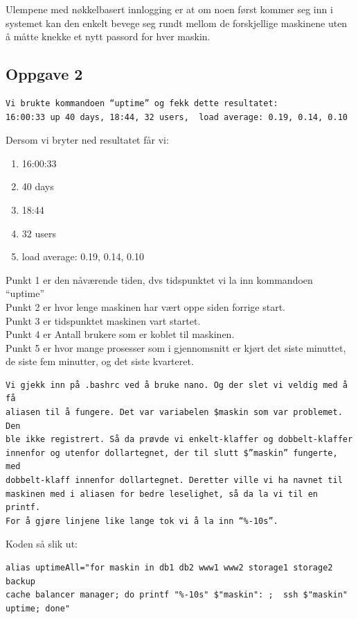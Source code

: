 \documentclass[a4paper, norsk, 12pt]{article}
\begin{document}
Ulempene med nøkkelbasert innlogging er at om noen først kommer seg inn i systemet kan den enkelt bevege seg rundt mellom de forskjellige maskinene uten å måtte knekke et nytt passord for hver maskin.

\subsection*{Oppgave 2}
\begin{verbatim}
Vi brukte kommandoen “uptime” og fekk dette resultatet:
16:00:33 up 40 days, 18:44, 32 users,  load average: 0.19, 0.14, 0.10
\end{verbatim}

Dersom vi bryter ned resultatet får vi:\\
\begin{enumerate}
\item 16:00:33
\item 40 days
\item 18:44
\item 32 users
\item load average: 0.19, 0.14, 0.10
\end{enumerate}

Punkt 1 er den nåværende tiden, dvs tidspunktet vi la inn kommandoen “uptime”\\
Punkt 2 er hvor lenge maskinen har vært oppe siden forrige start.\\
Punkt 3 er tidspunktet maskinen vart startet.\\
Punkt 4 er Antall brukere som er koblet til maskinen.\\
Punkt 5 er hvor mange prosesser som i gjennomsnitt er kjørt det siste minuttet, de siste fem minutter, og det siste kvarteret.

\begin{verbatim}
Vi gjekk inn på .bashrc ved å bruke nano. Og der slet vi veldig med å få 
aliasen til å fungere. Det var variabelen $maskin som var problemet. Den 
ble ikke registrert. Så da prøvde vi enkelt-klaffer og dobbelt-klaffer 
innenfor og utenfor dollartegnet, der til slutt $”maskin” fungerte, med 
dobbelt-klaff innenfor dollartegnet. Deretter ville vi ha navnet til 
maskinen med i aliasen for bedre leselighet, så da la vi til en printf. 
For å gjøre linjene like lange tok vi å la inn “%-10s”.
\end{verbatim}

Koden så slik ut:
\begin{verbatim}
alias uptimeAll="for maskin in db1 db2 www1 www2 storage1 storage2 backup 
cache balancer manager; do printf "%-10s" $"maskin": ;  ssh $"maskin" 
uptime; done"
\end{verbatim}
\end{document}
